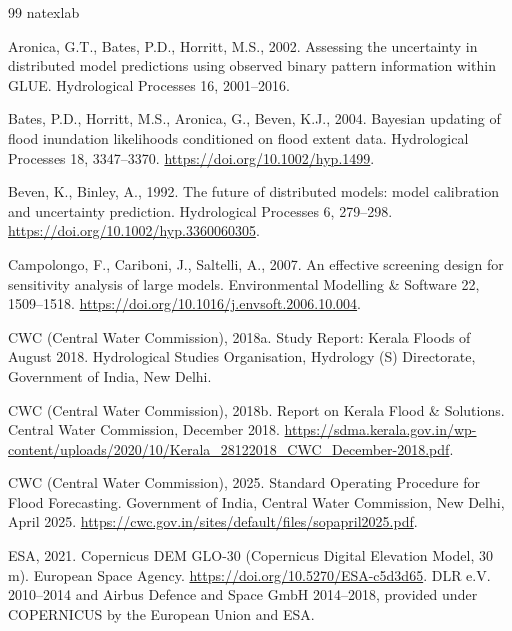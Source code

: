 \documentclass[preprint,12pt,authoryear]{elsarticle}
\begin{document}
\begin{thebibliography}{99}
\expandafter\ifx\csname natexlab\endcsname\relax\def\natexlab#1{#1}\fi

Aronica, G.T., Bates, P.D., Horritt, M.S., 2002. Assessing the uncertainty in distributed model predictions using observed binary pattern information within {GLUE}. Hydrological Processes 16, 2001--2016.

Bates, P.D., Horritt, M.S., Aronica, G., Beven, K.J., 2004. Bayesian updating of flood inundation likelihoods conditioned on flood extent data. Hydrological Processes 18, 3347--3370. \url{https://doi.org/10.1002/hyp.1499}.

Beven, K., Binley, A., 1992. The future of distributed models: model calibration and uncertainty prediction. Hydrological Processes 6, 279--298. \url{https://doi.org/10.1002/hyp.3360060305}.

Campolongo, F., Cariboni, J., Saltelli, A., 2007. An effective screening design for sensitivity analysis of large models. Environmental Modelling \& Software 22, 1509--1518. \url{https://doi.org/10.1016/j.envsoft.2006.10.004}.

CWC (Central Water Commission), 2018a. Study Report: Kerala Floods of August 2018. Hydrological Studies Organisation, Hydrology (S) Directorate, Government of India, New Delhi.

CWC (Central Water Commission), 2018b. Report on Kerala Flood \& Solutions. Central Water Commission, December 2018. \url{https://sdma.kerala.gov.in/wp-content/uploads/2020/10/Kerala_28122018_CWC_December-2018.pdf}.

CWC (Central Water Commission), 2025. Standard Operating Procedure for Flood Forecasting. Government of India, Central Water Commission, New Delhi, April 2025. \url{https://cwc.gov.in/sites/default/files/sopapril2025.pdf}.

ESA, 2021. Copernicus DEM GLO-30 (Copernicus Digital Elevation Model, 30 m). European Space Agency. \url{https://doi.org/10.5270/ESA-c5d3d65}. \textcopyright{} DLR e.V. 2010--2014 and \textcopyright{} Airbus Defence and Space GmbH 2014--2018, provided under COPERNICUS by the European Union and ESA.


\end{thebibliography}
\end{document}
